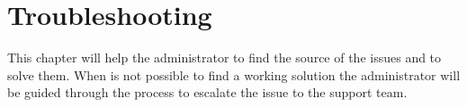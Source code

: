 \chapter{Troubleshooting}

This chapter will help the administrator to find the source of the issues and to solve them. When is not possible to find
a working solution the administrator will be guided through the process to escalate the issue to the support team.





